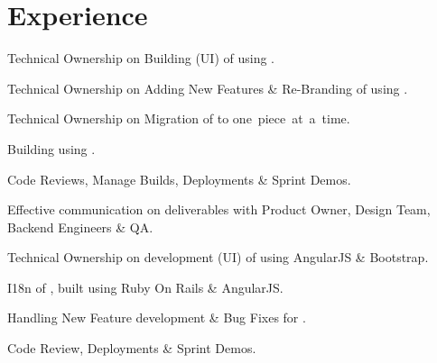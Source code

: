 \documentclass[]{my-resume-openfont}
\begin{document}
\hfill
\begin{minipage}[t]{0.66\textwidth}


\section{Experience}

\vspace{\topsep} %
\begin{tightemize}
\item{Technical Ownership on Building (UI) of \href{https://tools.wordstream.com/google-grader?my-email@email.com}{}using .}
\item{Technical Ownership on Adding New Features \& Re-Branding of \mbox{}using .}
\item{Technical Ownership on Migration of \mbox{}to \mbox{one piece at a time}.}
\item{Building \mbox{}using .}
\item{Code Reviews, Manage Builds, Deployments \& Sprint Demos.}
\item{Effective communication on deliverables with Product Owner, Design Team, Backend Engineers \& QA.}
\end{tightemize}
\sectionsep

\begin{tightemize}
\item{Technical Ownership on development (UI) of  using AngularJS \& Bootstrap.}
\item{I18n of , built using Ruby On Rails \& AngularJS.}
\item{Handling New Feature development \& Bug Fixes for .}
\item{Code Review, Deployments \& Sprint Demos.}
\end{tightemize}
\sectionsep


\end{minipage}
\end{document}
